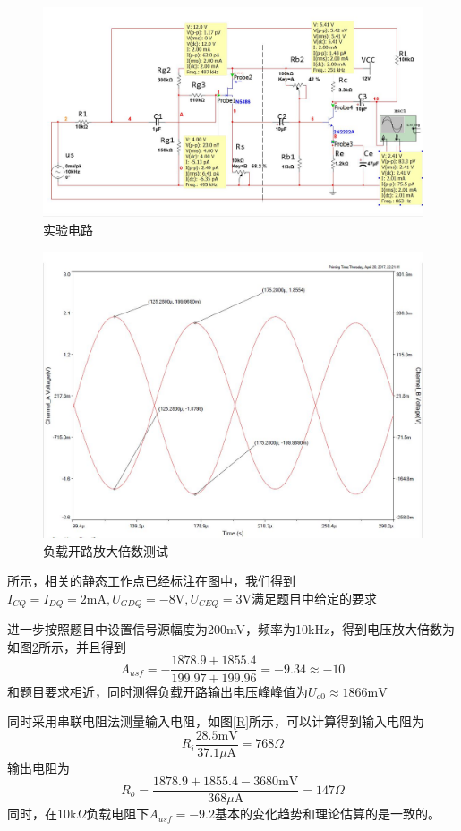 \documentclass[UTF8,a4paper]{ctexart}
\begin{document}
\begin{figure}
\centering
\includegraphics[width=\textwidth]{cir.jpg}
\caption{实验电路}
\label{ACT}
\end{figure}
\begin{figure}
\centering
\includegraphics[width=\textwidth]{A.jpg}
\caption{负载开路放大倍数测试}
\label{A}
\end{figure}
所示，相关的静态工作点已经标注在图中，我们得到$I_{CQ}=I_{DQ}=2\mathrm{mA},U_{GDQ}=-8\mathrm{V},U_{CEQ}=3\mathrm{V}$满足题目中给定的要求

进一步按照题目中设置信号源幅度为200mV，频率为10kHz，得到电压放大倍数为如图\ref{A}所示，并且得到
$$A_{usf}=-\frac{1878.9+1855.4}{199.97+199.96}=-9.34\approx -10$$
和题目要求相近，同时测得负载开路输出电压峰峰值为$U_{o0}\approx1866\mathrm{mV}$

同时采用串联电阻法测量输入电阻，如图\ref{R}所示，可以计算得到输入电阻为
$$R_i\frac{28.5\mathrm{mV}}{37.1\mu\mathrm{A}}=768\Omega$$
输出电阻为$$R_o=\frac{1878.9+1855.4-3680\mathrm{mV}}{368\mu\mathrm{A}}=147\Omega$$
同时，在$10\mathrm{k}\Omega$负载电阻下$A_{usf}=-9.2$基本的变化趋势和理论估算的是一致的。
\end{document}
